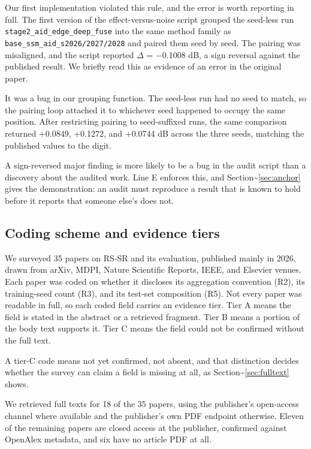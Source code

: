 \documentclass[pdflatex,sn-nature]{sn-jnl}
\begin{document}
Our first implementation violated this rule, and the error is worth reporting in full. The first version of the effect-versus-noise script grouped the seed-less run \texttt{stage2\_\allowbreak aid\_\allowbreak edge\_\allowbreak deep\_\allowbreak fuse} into the same method family as \texttt{base\_\allowbreak ssm\_\allowbreak aid\_\allowbreak s2026/2027/2028} and paired them seed by seed. The pairing was misaligned, and the script reported $\Delta$ = $-$0.1008 dB, a sign reversal against the published result. We briefly read this as evidence of an error in the original paper.

It was a bug in our grouping function. The seed-less run had no seed to match, so the pairing loop attached it to whichever seed happened to occupy the same position. After restricting pairing to seed-suffixed runs, the same comparison returned +0.0849, +0.1272, and +0.0744 dB across the three seeds, matching the published values to the digit.

A sign-reversed major finding is more likely to be a bug in the audit script than a discovery about the audited work. Line E enforces this, and Section\textasciitilde{}\ref{sec:anchor} gives the demonstration: an audit must reproduce a result that is known to hold before it reports that someone else's does not.

\subsection{Coding scheme and evidence tiers}\label{sec:coding}

We surveyed 35 papers on RS-SR and its evaluation, published mainly in 2026, drawn from arXiv, MDPI, Nature Scientific Reports, IEEE, and Elsevier venues. Each paper was coded on whether it discloses its aggregation convention (R2), its training-seed count (R3), and its test-set composition (R5). Not every paper was readable in full, so each coded field carries an evidence tier. Tier A means the field is stated in the abstract or a retrieved fragment. Tier B means a portion of the body text supports it. Tier C means the field could not be confirmed without the full text.

A tier-C code means not yet confirmed, not absent, and that distinction decides whether the survey can claim a field is missing at all, as Section\textasciitilde{}\ref{sec:fulltext} shows.

We retrieved full texts for 18 of the 35 papers, using the publisher's open-access channel where available and the publisher's own PDF endpoint otherwise. Eleven of the remaining papers are closed access at the publisher, confirmed against OpenAlex metadata, and six have no article PDF at all.
\end{document}
